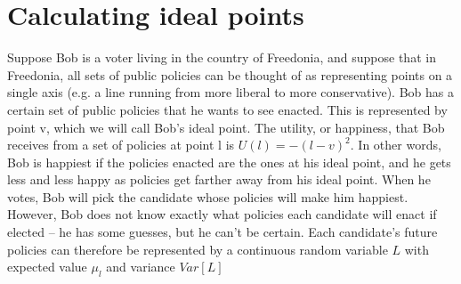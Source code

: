 \documentclass[12pt]{article}
\begin{document}
\section{Calculating ideal points}
Suppose Bob is a voter living in the country of Freedonia, and suppose that in Freedonia, all sets of public policies can be thought of as representing points on a single axis (e.g. a line running from more liberal to more conservative). Bob has a certain set of public policies that he wants to see enacted. This is represented by point v, which we will call Bob’s ideal point. The utility, or happiness, that Bob receives from a set of policies at point l is $U(l) = -(l - v)^2$. In other words, Bob is happiest if the policies enacted are the ones at his ideal point, and he gets less and less happy as policies get farther away from his ideal point. When he votes, Bob will pick the candidate whose policies will make him happiest. However, Bob does not know exactly what policies each candidate will enact if elected – he has some guesses, but he can’t be certain. Each candidate’s future policies can therefore be represented by a continuous random variable $L$ with expected value $\mu_l$ and variance $Var[L]$
\end{document}
